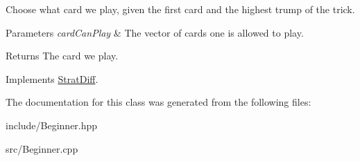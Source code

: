 \-Choose what card we play, given the first card and the highest trump of the trick. 


\begin{DoxyParams}{\-Parameters}
{\em card\-Can\-Play} & \-The vector of cards one is allowed to play. \\
\hline
\end{DoxyParams}
\begin{DoxyReturn}{\-Returns}
\-The card we play. 
\end{DoxyReturn}


\-Implements \hyperlink{classStratDiff_a7882bac82aa02692bf5e6b33e9c4ae6c}{\-Strat\-Diff}.



\-The documentation for this class was generated from the following files\-:\begin{DoxyCompactItemize}
\item 
include/\-Beginner.\-hpp\item 
src/\-Beginner.\-cpp\end{DoxyCompactItemize}
